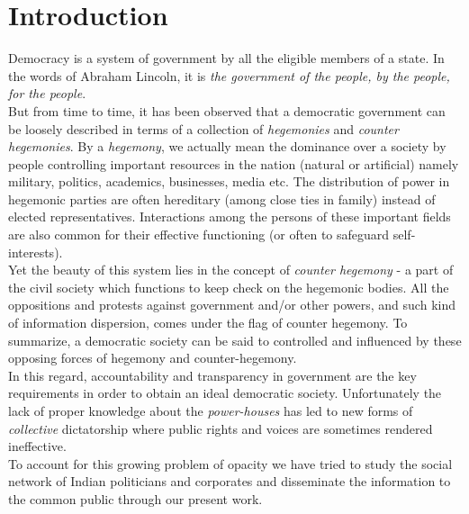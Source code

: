 \chapter{Introduction}

Democracy is a system of government by all the eligible members of a state. In the words of Abraham Lincoln, it is \emph{the government of the people, by the people, for the people}.\\  

But from time to time, it has been observed that a democratic government can be loosely described in terms of a collection of \emph{ hegemonies } and \emph{counter hegemonies}. By a \emph{hegemony}, we actually mean the dominance over a society by people controlling important resources in the nation (natural or artificial) namely military, politics, academics, businesses, media etc. The distribution of power in hegemonic parties are often hereditary (among close ties in family) instead of elected representatives. Interactions among the persons of these important fields are also common for their effective functioning (or often to safeguard self-interests). \\

Yet the beauty of this system lies in the concept of \emph{counter hegemony} - a part of the civil society which functions to keep check on the hegemonic bodies. All the oppositions and protests against government and/or other powers, and such kind of information dispersion, comes under the flag of counter hegemony. To summarize, a democratic society can be said to controlled and influenced by these opposing forces of hegemony and counter-hegemony. \\

In this regard, accountability and transparency in government are the key requirements in order to obtain an ideal democratic society. Unfortunately the lack of proper knowledge about the \emph{power-houses} has led to new forms of \emph{collective} dictatorship where public rights and voices are sometimes rendered ineffective. \\

To account for this growing problem of opacity we have tried to study the social network of Indian politicians and corporates and disseminate the information to the common public through our present work.


